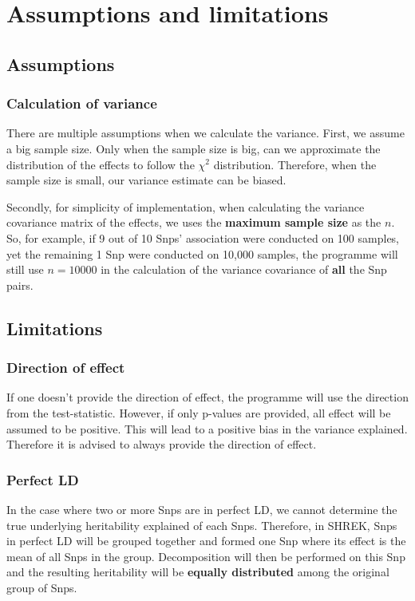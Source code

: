 \documentclass[12pt,a4paper,twoside]{report}
\begin{document}
\chapter{Assumptions and limitations}
\section{Assumptions}
\subsection{Calculation of variance}
There are multiple assumptions when we calculate the variance. 
First, we assume a big sample size. Only when the sample size is big, can we approximate the distribution of the effects to follow the $\chi^2$ distribution. 
Therefore, when the sample size is small, our variance estimate can be biased.

Secondly, for simplicity of implementation, when calculating the variance covariance matrix of the effects, we uses the \textbf{maximum sample size} as the $n$.
So, for example, if 9 out of 10 Snps' association were conducted on 100 samples, yet the remaining 1 Snp were conducted on 10,000 samples, the programme will still use $n= 10000$ in the calculation of the variance covariance of \textbf{all} the Snp pairs.
\section{Limitations}
\subsection{Direction of effect}
If one doesn't provide the direction of effect, the programme will use the direction from the test-statistic. 
However, if only p-values are provided, all effect will be assumed to be positive. 
This will lead to a positive bias in the variance explained.
Therefore it is advised to always provide the direction of effect.
\subsection{Perfect LD}
In the case where two or more Snps are in perfect LD, we cannot determine the true underlying heritability explained of each Snps.
Therefore, in SHREK, Snps in perfect LD will be grouped together and formed one Snp where its effect is the mean of all Snps in the group.
Decomposition will then be performed on this Snp and the resulting heritability will be \textbf{equally distributed} among the original group of Snps.
\end{document}
